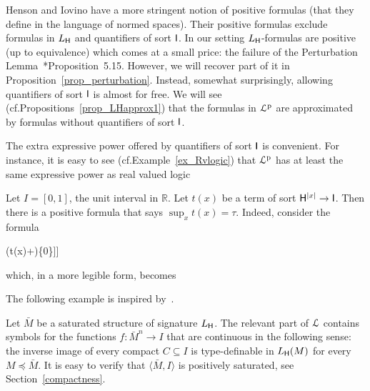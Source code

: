 \documentclass[10pt,oneside]{amsproc}
\def\dotminus{\stackon[.2ex]{$-$}{$.$}}
\def\forallH{\forall}
\def\existsH{\exists}
\def\forallI{\forall}
\begin{document}
Henson and Iovino have a more stringent notion of positive formulas (that they define in the language of normed spaces).
Their positive formulas exclude formulas in $L_{\sf H}$ and quantifiers of sort ${\sf I}$.
In our setting $L_{\sf H}$-formulas are positive (up to equivalence) which comes at a small price: the failure of the Perturbation Lemma~\cite{HI}*{Proposition~5.15}.
However, we will recover part of it in Proposition~\ref{prop_perturbation}.
Instead, somewhat surprisingly, allowing quantifiers of sort ${\sf I}$ is almost for free.
We will see (cf.\@ Propositions~\ref{prop_LHapprox1}) that the formulas in ${\EuScript L}^{\rm p}$ are approximated by formulas without quantifiers of sort ${\sf I}$.

The extra expressive power offered by quantifiers of sort ${\sf I}$ is convenient.
For instance, it is easy to see (cf.\@ Example~\ref{ex_Rvlogic}) that ${\EuScript L}^{\rm p}$ has at least the same expressive power as real valued logic%

\begin{example}\label{ex_Rvlogic}
  Let $I=[0,1]$, the unit interval in $\mathds{R}$.
  Let $t(x)$ be a term of sort ${\sf H}^{|x|}\to {\sf I}$.
  Then there is a positive formula that says $\sup_x t(x)=\tau$.
  Indeed, consider the formula

  \ceq{\hfill\forallH x\ \big[t(x)\dotminus\tau\in\{0\}\big]}
  {\wedge}{\forallI \varepsilon \Big[\varepsilon\in\{0\}\ \vee\ \existsH x\ \big[\tau\dotminus (t(x)+\varepsilon)\in\{0\}\big]\Big]}

  which, in a more legible form, becomes

  \ceq{\hfill\forallH x\ \big[t(x)\le\tau\big]}{\wedge}{\forallI \varepsilon>0\ \existsH x\ \big[\tau\le t(x)+ \varepsilon\big].}
\end{example}

The following example is inspired by~\cite{HPP}.

\begin{example}\label{ex_HPP}
  Let $\bar M$ be a saturated structure of signature $L_{\sf H}$.
  The relevant part of ${\EuScript L}$ contains symbols for the functions $f:\bar M^n\to I$ that are continuous in the following sense: the inverse image of every compact $C\subseteq I$ is type-definable in $L_{\sf H}(M)$ for every $M\preceq\bar M$.
  It is easy to verify that $\langle\bar M, I\rangle$ is positively saturated, see Section~\ref{compactness}.
\end{example}
\end{document}
